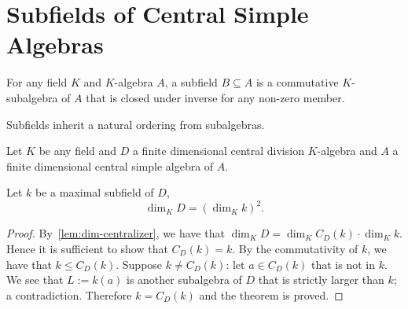 \section{Subfields of Central Simple Algebras}\label{sec:subfield}

\begin{definition}[Subfield]
  For any field $K$ and $K$-algebra $A$, a subfield $B \subseteq A$ is a commutative $K$-subalgebra of $A$ that is closed under inverse for any non-zero member.
  \leanok
\end{definition}

\begin{remark}
  Subfields inherit a natural ordering from subalgebras.
\end{remark}

Let $K$ be any field and $D$ a finite dimensional central division $K$-algebra and $A$ a finite dimensional central simple algebra of $A$.
\begin{lemma}\label{lem:dim-maximal-subfield}
  Let $k$ be a maximal subfield of $D$,
  \[
    \dim_{K}D = {\left(\dim_{K}k\right)}^{2}.
  \]
  \leanok
\end{lemma}

\begin{proof}
  By~\cref{lem:dim-centralizer}, we have that $\dim_{K} D = \dim_{K}C_{D}(k)\cdot \dim_{K}k$. Hence it is sufficient to show that $C_{D}(k) = k$. By the commutativity of $k$, we have that $k \le C_{D}(k)$. Suppose $k \ne C_{D}(k)$: let $a \in C_{D}(k)$ that is not in $k$. We see that $L := k(a)$ is another subalgebra of $D$ that is strictly larger than $k$; a contradiction. Therefore $k = C_{D}(k)$ and the theorem is proved.
\end{proof}

